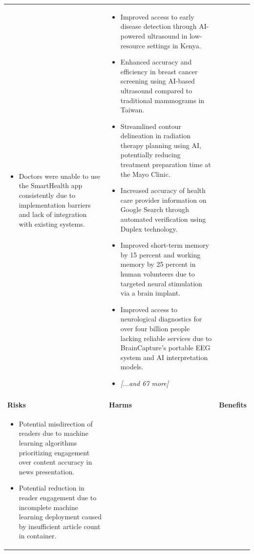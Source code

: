 \begin{longtable}{p{5.2cm}|p{5.2cm}|p{5.2cm}}
\begin{itemize}[leftmargin=*, nosep, before=\vspace{-0.5\baselineskip}, after=\vspace{-0.5\baselineskip}]
\item Doctors were unable to use the SmartHealth app consistently due to implementation barriers and lack of integration with existing systems.
\end{itemize} & \begin{itemize}[leftmargin=*, nosep, before=\vspace{-0.5\baselineskip}, after=\vspace{-0.5\baselineskip}] 
\footnotesize
\item Improved access to early disease detection through AI-powered ultrasound in low-resource settings in Kenya.
\item Enhanced accuracy and efficiency in breast cancer screening using AI-based ultrasound compared to traditional mammograms in Taiwan.
\item Streamlined contour delineation in radiation therapy planning using AI, potentially reducing treatment preparation time at the Mayo Clinic.
\item Increased accuracy of health care provider information on Google Search through automated verification using Duplex technology.
\item Improved short-term memory by 15 percent and working memory by 25 percent in human volunteers due to targeted neural stimulation via a brain implant.
\item Improved access to neurological diagnostics for over four billion people lacking reliable services due to BrainCapture's portable EEG system and AI interpretation models.
\item \textit{[...and 67 more]}
\end{itemize} \\
\pagebreak
\multicolumn{3}{l}{\textbf{\large Media and Communication} \textit{(N=70 articles)}} \\
\midrule
\textbf{Risks} & \textbf{Harms} & \textbf{Benefits} \\
\midrule
\begin{itemize}[leftmargin=*, nosep, before=\vspace{-0.5\baselineskip}, after=\vspace{-0.5\baselineskip}] 
\footnotesize
\item Potential misdirection of readers due to machine learning algorithms prioritizing engagement over content accuracy in news presentation.
\item Potential reduction in reader engagement due to incomplete machine learning deployment caused by insufficient article count in container.

\end{itemize}
\end{longtable}
